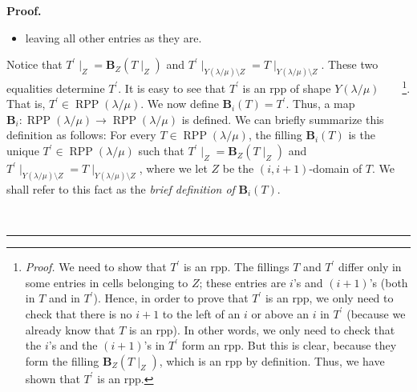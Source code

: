 \documentclass[numbers=enddot,12pt,final,onecolumn,notitlepage]{scrartcl}%
\theoremstyle{definition}
\newenvironment{proof}[1][Proof]{\noindent\textbf{#1.} }{\ \rule{0.5em}{0.5em}}
\newenvironment{verlong}{}{}
\begin{document}
\begin{verlong}
\begin{proof}
\begin{itemize}
\item leaving all other entries as they are.
\end{itemize}

Notice that $T^{\prime}\mid_{Z}=\mathbf{B}_{Z}\left(  T\mid_{Z}\right)  $ and
$T^{\prime}\mid_{Y\left(  \lambda/\mu\right)  \setminus Z}=T\mid_{Y\left(
\lambda/\mu\right)  \setminus Z}$. These two equalities determine $T^{\prime}%
$. It is easy to see that $T^{\prime}$ is an rpp of shape $Y\left(
\lambda/\mu\right)  $\ \ \ \ \footnote{\textit{Proof.} We need to show that
$T^{\prime}$ is an rpp. The fillings $T$ and $T^{\prime}$ differ only in some
entries in cells belonging to $Z$; these entries are $i$'s and $\left(
i+1\right)  $'s (both in $T$ and in $T^{\prime}$). Hence, in order to prove
that $T^{\prime}$ is an rpp, we only need to check that there is no $i+1$ to
the left of an $i$ or above an $i$ in $T^{\prime}$ (because we already know
that $T$ is an rpp). In other words, we only need to check that the $i$'s and
the $\left(  i+1\right)  $'s in $T^{\prime}$ form an rpp. But this is clear,
because they form the filling $\mathbf{B}_{Z}\left(  T\mid_{Z}\right)  $,
which is an rpp by definition. Thus, we have shown that $T^{\prime}$ is an
rpp.}. That is, $T^{\prime}\in\operatorname*{RPP}\left(  \lambda/\mu\right)
$. We now define $\mathbf{B}_{i}\left(  T\right)  =T^{\prime}$. Thus, a map
$\mathbf{B}_{i}:\operatorname*{RPP}\left(  \lambda/\mu\right)  \rightarrow
\operatorname*{RPP}\left(  \lambda/\mu\right)  $ is defined. We can briefly
summarize this definition as follows: For every $T\in\operatorname*{RPP}%
\left(  \lambda/\mu\right)  $, the filling $\mathbf{B}_{i}\left(  T\right)  $
is the unique $T^{\prime}\in\operatorname*{RPP}\left(  \lambda/\mu\right)  $
such that $T^{\prime}\mid_{Z}=\mathbf{B}_{Z}\left(  T\mid_{Z}\right)  $ and
$T^{\prime}\mid_{Y\left(  \lambda/\mu\right)  \setminus Z}=T\mid_{Y\left(
\lambda/\mu\right)  \setminus Z}$, where we let $Z$ be the $\left(
i,i+1\right)  $-domain of $T$. We shall refer to this fact as the
\textit{brief definition of }$\mathbf{B}_{i}\left(  T\right)  $.



\end{proof}
\end{verlong}
\end{document}
